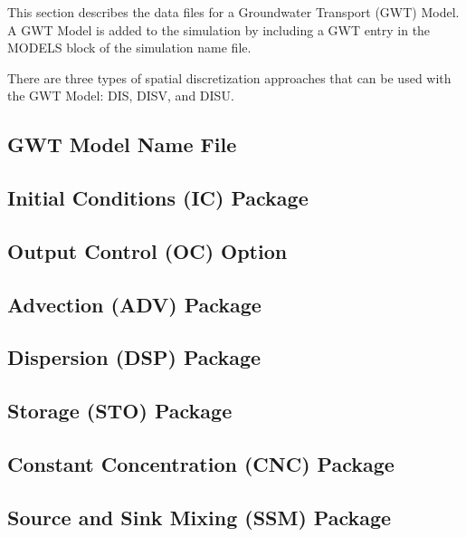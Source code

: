 This section describes the data files for a \mf Groundwater Transport (GWT) Model.  A GWT Model is added to the simulation by including a GWT entry in the MODELS block of the simulation name file.

There are three types of spatial discretization approaches that can be used with the GWT Model: DIS, DISV, and DISU.

\newpage
\subsection{GWT Model Name File}


%

%

%

\newpage
\subsection{Initial Conditions (IC) Package}


\newpage
\subsection{Output Control (OC) Option}


\newpage
\subsection{Advection (ADV) Package}


\newpage
\subsection{Dispersion (DSP) Package}


\newpage
\subsection{Storage (STO) Package}


\newpage
\subsection{Constant Concentration (CNC) Package}


\newpage
\subsection{Source and Sink Mixing (SSM) Package}


%

